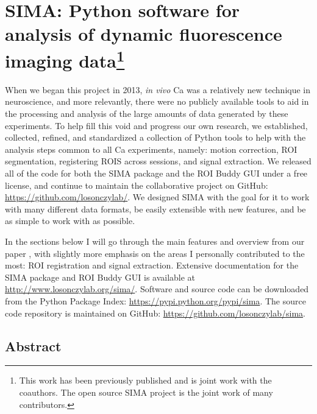 \acresetall
\chapter[SIMA Analysis Software]{SIMA: Python software for analysis of dynamic fluorescence imaging data\footnote{This work has been previously published \citep{Kaifosh2014} and is joint work with the coauthors. The open source SIMA project is the joint work of many contributors.}}
\label{ch:sima}

When we began this project in 2013, \emph{in vivo} Ca was a relatively new technique in neuroscience, and more relevantly, there were no publicly available tools to aid in the processing and analysis of the large amounts of data generated by these experiments.
To help fill this void and progress our own research, we established, collected, refined, and standardized a collection of Python tools to help with the analysis steps common to all Ca experiments, namely: motion correction, ROI segmentation, registering ROIS across sessions, and signal extraction.
We released all of the code for both the SIMA package and the ROI Buddy GUI under a free license, and continue to maintain the collaborative project on GitHub: \url{https://github.com/losonczylab/}. 
We designed SIMA with the goal for it to work with many different data formats, be easily extensible with new features, and be as simple to work with as possible.

In the sections below I will go through the main features and overview from our paper \citep{Kaifosh2014}, with slightly more emphasis on the areas I personally contributed to the most: ROI registration and signal extraction.
Extensive documentation for the SIMA package and ROI Buddy GUI
is available at \url{http://www.losonczylab.org/sima/}.
Software and source code can be downloaded from the Python Package Index: 
\url{https://pypi.python.org/pypi/sima}.
The source code repository is maintained on GitHub:
\url{https://github.com/losonczylab/sima}.

\section{Abstract}

